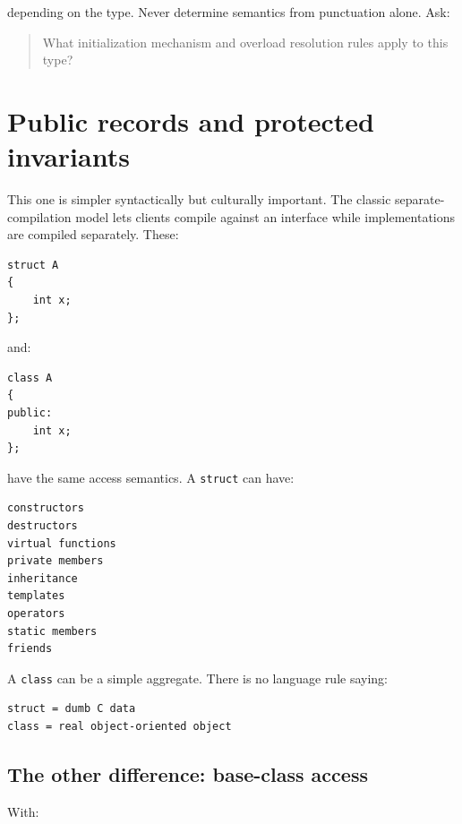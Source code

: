 depending on the type. Never determine semantics from punctuation alone. Ask:

\begin{quote}
What initialization mechanism and overload resolution rules apply to this type?
\end{quote}

\section{Public records and protected invariants}\label{01-foundations-i-ch003-public-records-and-protected-invariants}

\hypertarget{01-foundations-i-ch003-public-records-and-protected-invariants}{}

This one is simpler syntactically but culturally important. The classic separate-compilation model lets clients compile against an interface while implementations are compiled separately. These:

\begin{verbatim}
struct A
{
    int x;
};
\end{verbatim}

and:

\begin{verbatim}
class A
{
public:
    int x;
};
\end{verbatim}

have the same access semantics. A \texttt{struct} can have:

\begin{verbatim}
constructors
destructors
virtual functions
private members
inheritance
templates
operators
static members
friends
\end{verbatim}

A \texttt{class} can be a simple aggregate. There is no language rule saying:

\begin{verbatim}
struct = dumb C data
class = real object-oriented object
\end{verbatim}

\subsection{The other difference: base-class access}\label{01-foundations-i-ch003-the-other-difference-base-class-access}

\hypertarget{01-foundations-i-ch003-the-other-difference-base-class-access}{}

With:

